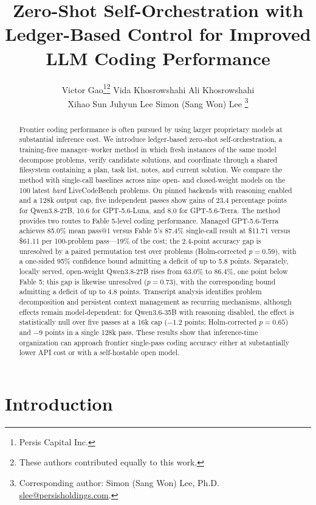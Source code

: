 \documentclass[11pt]{article}
\title{\bfseries Zero-Shot Self-Orchestration with Ledger-Based Control for Improved LLM Coding Performance}
\author{%
  Victor Gao\thanks{Persis Capital Inc.}\hspace{0.35em}\thanks{These authors contributed equally to this work.}\quad
  Vida Khosrowshahi\footnotemark[1]\hspace{0.35em}\footnotemark[2]\quad
  Ali Khosrowshahi\footnotemark[1]\hspace{0.35em}\footnotemark[2]\\[0.4ex]
  Xihao Sun\footnotemark[1]\quad
  Juhyun Lee\quad
  Simon (Sang Won) Lee\footnotemark[1]\hspace{0.35em}%
  \thanks{Corresponding author: Simon (Sang Won) Lee, Ph.D.
     \href{mailto:slee@persisholdings.com}{slee@persisholdings.com}.}
}
\date{}
\begin{document}
\maketitle

\begin{abstract}
\noindent
Frontier coding performance is often pursued by using larger proprietary models at
substantial inference cost. We introduce ledger-based zero-shot self-orchestration, a
training-free manager–worker method in which fresh instances of the same model decompose
problems, verify candidate solutions, and coordinate through a shared filesystem
containing a plan, task list, notes, and current solution. We compare the method with
single-call baselines across nine open- and closed-weight models on the 100 latest
\textit{hard} LiveCodeBench problems. On pinned backends with reasoning enabled and a
128k output cap, five independent passes show gains of 23.4 percentage points for
Qwen3.8-27B, 10.6 for GPT-5.6-Luna, and 8.0 for GPT-5.6-Terra. The method provides two
routes to Fable 5-level coding performance. Managed GPT-5.6-Terra achieves 85.0\% mean
pass@1 versus Fable 5's 87.4\% single-call result at \$11.71 versus \$61.11 per
100-problem pass---19\% of the cost; the 2.4-point accuracy gap is unresolved by a paired
permutation test over problems (Holm-corrected $p = 0.59$), with a one-sided 95\%
confidence bound admitting a deficit of up to 5.8 points. Separately, locally served,
open-weight Qwen3.8-27B rises from 63.0\% to 86.4\%, one point below Fable 5; this gap is
likewise unresolved ($p = 0.73$), with the corresponding bound admitting a deficit of up
to 4.8 points. Transcript analysis identifies problem decomposition and persistent
context management as recurring mechanisms, although effects remain model-dependent: for
Qwen3.6-35B with reasoning disabled, the effect is statistically null over five passes at
a 16k cap ($-1.2$ points; Holm-corrected $p = 0.65$) and $-9$ points in a single 128k
pass. These results show that inference-time organization can approach frontier
single-pass coding accuracy either at substantially lower API cost or with a
self-hostable open model.
\end{abstract}

\section{Introduction}
\end{document}
